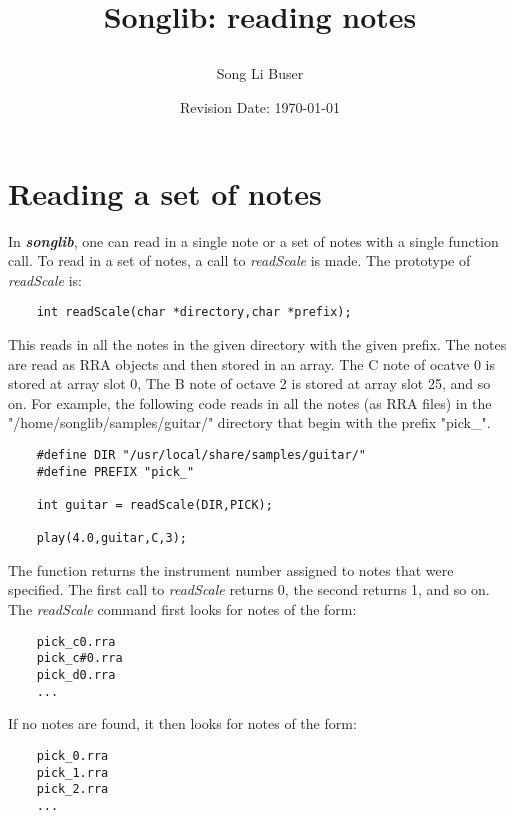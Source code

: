 \documentclass{article}
\title{Songlib: reading notes\\
\date{Revision Date: \today}}
\author{Song Li Buser}
\begin{document}
\maketitle

\W\subsubsection*{}
\W\htmlrule


\section{Reading a set of notes}

In {\bf\it songlib}, one can read in a single note or
a set of notes with a single function call.
To
read in a set of notes, a call to {\it readScale} is
made. The prototype of {\it readScale} is:

\begin{verbatim}
    int readScale(char *directory,char *prefix);
\end{verbatim}

This reads in all the notes in the given directory with the given
prefix. The notes are read as RRA objects and then stored in
an array. The C note of ocatve 0 is stored at array slot 0,
The B note of octave 2 is stored at array slot 25, and so on.
For example, the following code reads in all the notes (as RRA
files) in the "/home/songlib/samples/guitar/" directory that begin with
the prefix "pick\_".

\begin{verbatim}
    #define DIR "/usr/local/share/samples/guitar/"
    #define PREFIX "pick_"

    int guitar = readScale(DIR,PICK);

    play(4.0,guitar,C,3);
\end{verbatim}

The function returns the instrument number assigned to notes that were
specified. The first call to {\it readScale} returns 0, the second returns 1,
and so on. The {\it readScale} command first looks for notes of the form:

\begin{verbatim}
    pick_c0.rra
    pick_c#0.rra
    pick_d0.rra
    ...
\end{verbatim}

If no notes are found, it then looks for notes of the form:

\begin{verbatim}
    pick_0.rra
    pick_1.rra
    pick_2.rra
    ...
\end{verbatim}
\end{document}
